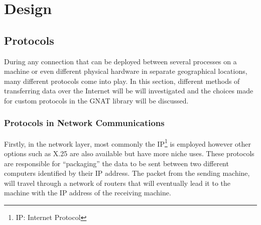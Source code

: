 \chapter{Design}

\section{Protocols}
During any connection that can be deployed between several processes on a machine or even different physical hardware in separate geographical locations, many different protocols come into play. In this section, different methods of transferring data over the Internet will be will investigated and the choices made for custom protocols in the GNAT library will be discussed.

\subsection{Protocols in Network Communications}
Firstly, in the network layer, most commonly the IP\footnote{IP: Internet Protocol} is employed however other options such as X.25 are also available but have more niche uses. These protocols are responsible for ``packaging'' the data to be sent between two different computers identified by their IP address. The packet from the sending machine, will travel through a network of routers that will eventually lead it to the machine with the IP address of the receiving machine.

